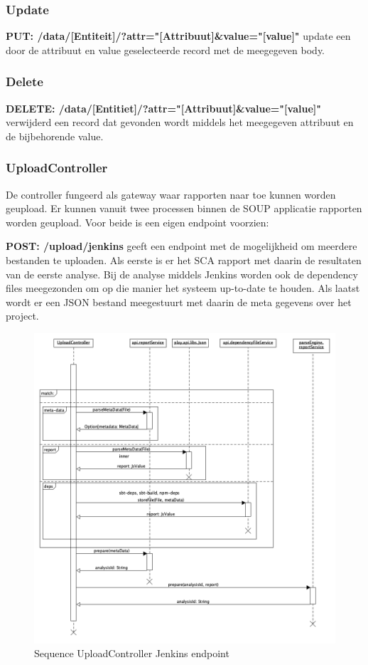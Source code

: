 \subsubsection*{Update}
\textbf{PUT: /data/[Entiteit]/?attr="[Attribuut]&value="[value]"} update een door de attribuut en value geselecteerde record met de meegegeven body.
\subsubsection*{Delete}
\textbf{DELETE: /data/[Entitiet]/?attr="[Attribuut]&value="[value]"} verwijderd een record dat gevonden wordt middels het meegegeven attribuut en de bijbehorende value.

\subsubsection{UploadController}
De controller fungeerd als gateway waar rapporten naar toe kunnen worden geupload. Er kunnen vanuit twee processen binnen de SOUP applicatie rapporten worden geupload. Voor beide is een eigen endpoint voorzien:

\textbf{POST: /upload/jenkins} geeft een endpoint met de mogelijkheid om meerdere bestanden te uploaden. Als eerste is er het SCA rapport met daarin de resultaten van de eerste analyse. Bij de analyse middels Jenkins worden ook de dependency files meegezonden om op die manier het systeem up-to-date te houden. Als laatst wordt er een JSON bestand meegestuurt met daarin de meta gegevens over het project.

\begin{figure}[bth]
    \myfloatalign
    \includegraphics[width=12cm]{gfx/umlet/exports/SequploadController-Jenkins}
    \caption{Sequence UploadController Jenkins endpoint}
    \label{fig:SequenceUploadReportJenkins}
\end{figure}

